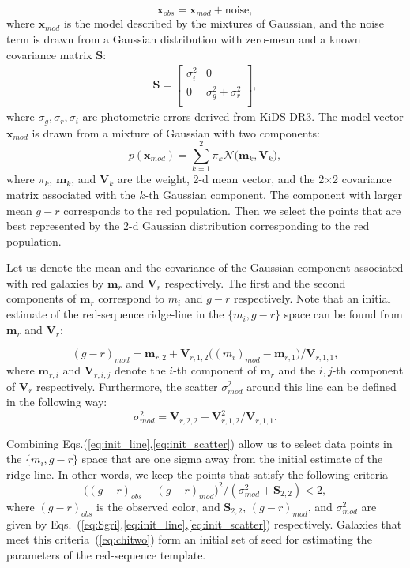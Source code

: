 \documentclass[fleqn,usenatbib]{mnras}
\newcommand{\be}{\begin{equation}}
\newcommand{\ee}{\end{equation}}
\begin{document}
\be 
\mathbf{x}_{obs} = \mathbf{x}_{mod} + \mathrm{noise},
\label{eq:xdmod}
\ee
where $\mathbf{x}_{mod}$ is the model described by the mixtures of Gaussian, and the noise term is drawn from a Gaussian distribution with zero-mean and a known covariance matrix $\mathbf{S}$:
\begin{eqnarray}
\mathbf{S} = 
\begin{bmatrix}
        \sigma_{i}^2      &                0   \\
 0        &         \sigma_{g}^2  +   \sigma_{r}^2  \\
 \end{bmatrix},
 \label{eq:Sgri}
\end{eqnarray} 
where $\sigma_g , \sigma_r, \sigma_i$ are photometric errors derived from KiDS DR3. The model vector 
$\mathbf{x}_{mod}$ is drawn from a mixture of Gaussian with two components:
\be
p(\mathbf{x}_{mod}) = \sum_{k=1}^{2} \pi_{k} \mathcal{N} \big(\mathbf{m}_{k}, \mathbf{V}_k \big),
\ee
where $\pi_k$, $\mathbf{m}_k$, and $\mathbf{V}_k$ are the weight, 2-d mean vector, and the 2$\times$2 covariance matrix associated with the $k$-th Gaussian component. The component with larger mean $g-r$ corresponds to the red population. Then we select the points that are best represented by the 2-d Gaussian distribution corresponding to the red population. 

Let us denote the mean and the covariance of the Gaussian component associated with red galaxies by $\mathbf{m}_r$ and $\mathbf{V}_r$ respectively. The first and the second components of $\mathbf{m}_r$ correspond to $m_i$ and $g-r$ respectively. Note that an initial estimate of the red-sequence ridge-line in the $\{m_i, g-r\}$ space can be found from $\mathbf{m}_r$ and $\mathbf{V}_r$:

\be 
(g-r)_{mod} = \mathbf{m}_{r,2} + \mathbf{V}_{r,1,2}\big((m_i)_{mod} - \mathbf{m}_{r,1}\big)/\mathbf{V}_{r,1,1},
\label{eq:init_line}
\ee
where $\mathbf{m}_{r,i}$ and $\mathbf{V}_{r,i,j}$ denote the $i$-th component of $\mathbf{m}_{r}$ and the $i,j$-th component of $\mathbf{V}_{r}$ respectively. Furthermore, the scatter $\sigma^{2}_{mod}$ around this line can be defined in the following way:
\be 
\sigma^{2}_{mod} = \mathbf{V}_{r,2,2} - \mathbf{V}^{2}_{r,1,2}/\mathbf{V}_{r,1,1}.
\label{eq:init_scatter}
\ee 

Combining Eqs.(\ref{eq:init_line},\ref{eq:init_scatter}) allow us to select data points in the $\{m_i,g-r\}$ space that are one sigma away from the initial estimate of the ridge-line. In other words, we keep the points that satisfy the following criteria
\be 
\big((g-r)_{obs} - (g-r)_{mod} \big)^{2} / (\sigma^{2}_{mod} + \mathbf{S}_{2,2}) < 2,
\label{eq:chitwo}
\ee 
where $(g-r)_{obs}$ is the observed color, and $\mathbf{S}_{2,2}$, $(g-r)_{mod}$, and $\sigma^{2}_{mod}$ are given by Eqs.~(\ref{eq:Sgri},\ref{eq:init_line},\ref{eq:init_scatter}) respectively. Galaxies that meet this criteria~(\ref{eq:chitwo}) form an initial set of seed for estimating the parameters of the red-sequence template. 
\end{document}
